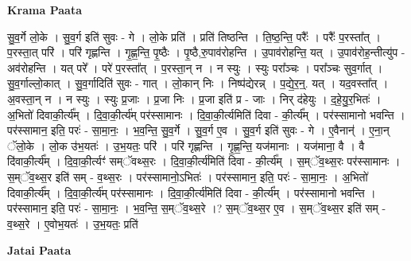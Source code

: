 \documentclass[17pt]{extarticle}
\begin{document}
\textbf{Krama Paata} \newline

सु॒व॒र्गे लो॒के । सु॒व॒र्ग इति॑ सुवः - गे । लो॒के प्रति॑ । प्रति॑ तिष्ठन्ति । ति॒ष्ठ॒न्ति॒ परैः᳚ । परैः᳚ प॒रस्ता᳚त् । प॒रस्ता॒त् परि॑ । परि॑ गृह्णन्ति । गृ॒ह्ण॒न्ति॒ पृ॒ष्ठैः । पृ॒ष्ठै,रु॒पाव॑रोहन्ति । उ॒पाव॑रोहन्ति॒ यत् । उ॒पाव॑रोह॒न्तीत्यु॑प - अव॑रोहन्ति । यत् परे᳚ । परे॑ प॒रस्ता᳚त् । प॒रस्ता॒न् न । न स्युः । स्युः परा᳚ञ्चः । परा᳚ञ्चः सुव॒र्गात् । सु॒व॒र्गाल्लो॒कात् । सु॒व॒र्गादिति॑ सुवः - गात् । लो॒कान् निः । निष्प॑द्येरन्न् । प॒द्ये॒र॒न्॒. यत् । यद॒वस्ता᳚त् । अ॒वस्ता॒न् न । न स्युः । स्युः प्र॒जाः । प्र॒जा निः । प्र॒जा इति॑ प्र - जाः । निर् द॑हेयुः । द॒हे॒यु॒र॒भितः॑ । अ॒भितो॑ दिवाकी॒र्त्य᳚म् । दि॒वा॒की॒र्त्य॑म् पर॑स्सामानः । दि॒वा॒की॒र्त्यमिति॑ दिवा - की॒र्त्य᳚म् । पर॑स्सामानो भवन्ति । पर॑स्सामान॒ इति॒ परः॑ - सा॒मा॒नः॒ । भ॒व॒न्ति॒ सु॒व॒र्गे । सु॒व॒र्ग ए॒व । सु॒व॒र्ग इति॑ सुवः - गे । ए॒वैनान्॑ । ए॒ना॒न् ॅलो॒के । लो॒क उ॑भ॒यतः॑ । उ॒भ॒यतः॒ परि॑ । परि॑ गृह्णन्ति । गृ॒ह्ण॒न्ति॒ यज॑मानाः । यज॑माना॒ वै । वै दि॑वाकी॒र्त्य᳚म् । दि॒वा॒की॒र्त्यꣳ॑ सम्ॅवथ्स॒रः । दि॒वा॒की॒र्त्य॑मिति॑ दिवा - की॒र्त्य᳚म् । स॒म्ॅव॒थ्स॒रः पर॑स्सामानः । स॒म्ॅव॒थ्स॒र इति॑ सम् - व॒थ्स॒रः । पर॑स्सामानो॒ऽभितः॑ । पर॑स्सामान॒ इति॒ परः॑ - सा॒मा॒नः॒ । अ॒भितो॑ दिवाकी॒र्त्य᳚म् । दि॒वा॒की॒र्त्य॑म् पर॑स्सामानः । दि॒वा॒की॒र्त्य॑मिति॑ दिवा - की॒र्त्य᳚म् । पर॑स्सामानो भवन्ति । पर॑स्सामान॒ इति॒ परः॑ - सा॒मा॒नः॒ । भ॒व॒न्ति॒ स॒म्ॅव॒थ्स॒रे ।? स॒म्ॅव॒थ्स॒र ए॒व । स॒म्ॅव॒थ्स॒र इति॑ सम् - व॒थ्स॒रे । ए॒वोभ॒यतः॑ । उ॒भ॒यतः॒ प्रति॑ \newline

\textbf{Jatai Paata} \newline
\end{document}
